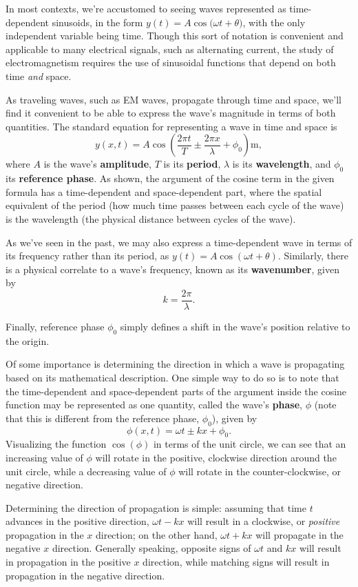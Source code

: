 \documentclass{article}
\begin{document}
In most contexts, we're accustomed to seeing waves represented as time-dependent sinusoids, in the form \(y(t) = A\cos{(\omega t + \theta})\), with the only independent variable being time. Though this sort of notation is convenient and applicable to many electrical signals, such as alternating current, the study of electromagnetism requires the use of sinusoidal functions that depend on both time \textit{and} space. 

As traveling waves, such as EM waves, propagate through time and space, we'll find it convenient to be able to express the wave's magnitude in terms of both quantities. The standard equation for representing a wave in time and space is
\[
	y(x,t) = A\cos{\left(\frac{2\pi t}{T} \pm \frac{2\pi x}{\lambda} + \phi_0\right) \mathrm{m}},
\]
where \(A\) is the wave's \textbf{amplitude}, \(T\) is its \textbf{period}, \(\lambda\) is its \textbf{wavelength}, and \(\phi_0\) its \textbf{reference phase}. As shown, the argument of the cosine term in the given formula has a time-dependent and space-dependent part, where the spatial equivalent of the period (how much time passes between each cycle of the wave) is the wavelength (the physical distance between cycles of the wave).

As we've seen in the past, we may also express a time-dependent wave in terms of its frequency rather than its period, as \(y(t) = A\cos{(\omega t + \theta)}\). Similarly, there is a physical correlate to a wave's frequency, known as its \textbf{wavenumber}, given by 
\[
  k = \frac{2\pi}{\lambda}.
\]

Finally, reference phase \(\phi_0\) simply defines a shift in the wave's position relative to the origin.

Of some importance is determining the direction in which a wave is propagating based on its mathematical description. One simple way to do so is to note that the time-dependent and space-dependent parts of the argument inside the cosine function may be represented as one quantity, called the wave's \textbf{phase}, \(\phi\) (note that this is different from the reference phase, \(\phi_0\)), given by
\[
  \phi(x,t) = \omega t \pm kx + \phi_0. 
\]
Visualizing the function \(\cos{(\phi)}\) in terms of the unit circle, we can see that an increasing value of \(\phi\) will rotate in the positive, clockwise direction around the unit circle, while a decreasing value of \(\phi\) will rotate in the counter-clockwise, or negative direction.

Determining the direction of propagation is simple: assuming that time \(t\) advances in the positive direction, \(\omega t - kx\) will result in a clockwise, or \textit{positive} propagation in the \(x\) direction; on the other hand, \(\omega t + kx\) will propagate in the negative \(x\) direction. Generally speaking, opposite signs of \(\omega t\) and \(kx\) will result in propagation in the positive \(x\) direction, while matching signs will result in propagation in the negative direction.
\end{document}
